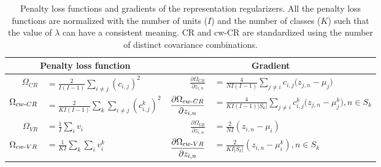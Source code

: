\documentclass[letterpaper]{article} %
\begin{document}
\begin{table}[t]
\caption{Penalty loss functions and gradients of the representation regularizers. All the penalty loss functions are normalized with the number of units ($I$) and the number of classes ($K$) such that the value of $\lambda$ can have a consistent meaning. CR and cw-CR are standardized using the number of distinct covariance combinations.}
\centering
\begin{tabular}{rlrl}
		\hline
		\multicolumn{2}{c}{Penalty loss function}  & \multicolumn{2}{c}{Gradient}  \\ \hline
		$\displaystyle{\Omega}_{CR}$ & $\displaystyle=\frac{2}{I(I-1)}\sum_{i\neq j} (c_{i,j})^{2} $    & $\displaystyle\frac{\partial{{\Omega}_{CR}}}{\partial{z_{i,n}}}$ & $\displaystyle=\frac{4}{NI(I-1)}\sum_{j\neq{i}}^{}{c_{i,j}(z_{j,n}-\mu_{j}})$  \\ 
		
		$\displaystyle{\Omega}_{cw{\text -}CR}$ & $\displaystyle=\frac{2}{KI(I-1)}\sum_k \sum_{i\neq j} (c_{i,j}^{k})^{2} $   & $\displaystyle\frac{\partial{{\Omega}_{cw{\text-}CR}}}{\partial{z_{i,n}}}$ & $\displaystyle=\frac{4}{KI(I-1)|S_k|}\sum_{j\neq{i}}^{}{c_{i,j}^{k}(z_{j,n}-\mu_{j}^{k}}),  n \in S_k$  \\ 
		
		$\displaystyle{\Omega}_{VR}$ & $\displaystyle=\frac{1}{I}\sum_i v_{i}$                                               & $\displaystyle\frac{\partial{{\Omega}_{VR}}}{\partial{z_{i,n}}}$ & $\displaystyle=\frac{2}{NI}(z_{i,n}-\mu_{i})$  \\
		
		$\displaystyle{\Omega}_{cw{\text -}VR}$ & $\displaystyle=\frac{1}{K I}\sum_k \sum_i v_{i}^k $                        & $\displaystyle\frac{\partial{{\Omega}_{cw{\text -}VR}}}{\partial{{z}_{i,n}}}$ & $\displaystyle =\frac{2}{KI|S_k|}({z}_{i,n}-{\mu}_{i}^{k}), n \in S_k$  \\ \hline
	\end{tabular}
\label{table:loss_function}
\end{table}
\end{document}
